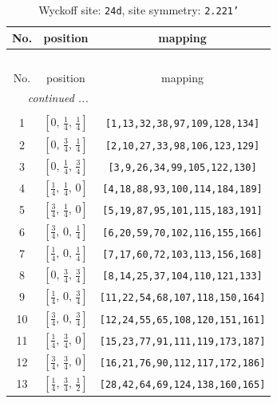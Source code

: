 \documentclass[fleqn,8pt]{jsarticle}
\begin{document}
\begin{longtable}{ccc}
\caption{Wyckoff site: {\tt 24d}, site symmetry: {\tt 2.221'}}
 \\
 \hline \hline
No. & position & mapping \\ \hline \endfirsthead

\multicolumn{2}{l}{\tablename\ \thetable{}} \\
 \hline \hline
No. & position & mapping \\ \hline \endhead

 \hline \hline
\multicolumn{2}{r}{\footnotesize\it continued ...} \\ \endfoot

 \hline \hline
\multicolumn{2}{r}{} \\ \endlastfoot

1 & $\left[ 0,\, \frac{1}{4},\, \frac{1}{4} \right]$ & {\tt [1,13,32,38,97,109,128,134]} \\ \hline
2 & $\left[ 0,\, \frac{3}{4},\, \frac{1}{4} \right]$ & {\tt [2,10,27,33,98,106,123,129]} \\ \hline
3 & $\left[ 0,\, \frac{1}{4},\, \frac{3}{4} \right]$ & {\tt [3,9,26,34,99,105,122,130]} \\ \hline
4 & $\left[ \frac{1}{4},\, \frac{1}{4},\, 0 \right]$ & {\tt [4,18,88,93,100,114,184,189]} \\ \hline
5 & $\left[ \frac{3}{4},\, \frac{1}{4},\, 0 \right]$ & {\tt [5,19,87,95,101,115,183,191]} \\ \hline
6 & $\left[ \frac{3}{4},\, 0,\, \frac{1}{4} \right]$ & {\tt [6,20,59,70,102,116,155,166]} \\ \hline
7 & $\left[ \frac{1}{4},\, 0,\, \frac{1}{4} \right]$ & {\tt [7,17,60,72,103,113,156,168]} \\ \hline
8 & $\left[ 0,\, \frac{3}{4},\, \frac{3}{4} \right]$ & {\tt [8,14,25,37,104,110,121,133]} \\ \hline
9 & $\left[ \frac{1}{4},\, 0,\, \frac{3}{4} \right]$ & {\tt [11,22,54,68,107,118,150,164]} \\ \hline
10 & $\left[ \frac{3}{4},\, 0,\, \frac{3}{4} \right]$ & {\tt [12,24,55,65,108,120,151,161]} \\ \hline
11 & $\left[ \frac{1}{4},\, \frac{3}{4},\, 0 \right]$ & {\tt [15,23,77,91,111,119,173,187]} \\ \hline
12 & $\left[ \frac{3}{4},\, \frac{3}{4},\, 0 \right]$ & {\tt [16,21,76,90,112,117,172,186]} \\ \hline
13 & $\left[ \frac{1}{4},\, \frac{3}{4},\, \frac{1}{2} \right]$ & {\tt [28,42,64,69,124,138,160,165]} \\ \hline

\end{longtable}
\end{document}
